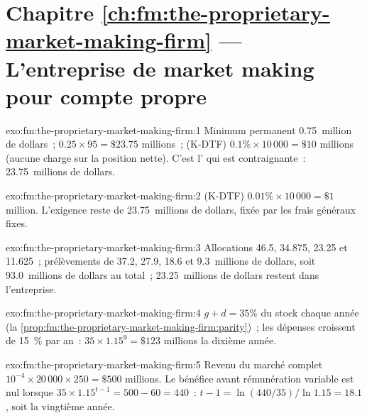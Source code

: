 \section*{Chapitre \ref{ch:fm:the-proprietary-market-making-firm} --- L'entreprise de market making pour compte propre}

\begin{solution}{exo:fm:the-proprietary-market-making-firm:1}
Minimum permanent 0.75~million de dollars~;  $0.25\times95=\$23.75$ millions~;  (K-DTF) $0.1\%\times10\,000=\$10$ millions (aucune
charge sur la position nette). C'est l' qui est contraignante~: 23.75~millions de dollars.
\end{solution}

\begin{solution}{exo:fm:the-proprietary-market-making-firm:2}
 (K-DTF) $0.01\%\times10\,000=\$1$ million. L'exigence reste de 23.75~millions de dollars, fixée par les frais généraux fixes.
\end{solution}

\begin{solution}{exo:fm:the-proprietary-market-making-firm:3}
Allocations 46.5, 34.875, 23.25 et 11.625~; prélèvements de 37.2, 27.9, 18.6 et 9.3~millions de dollars, soit 93.0~millions de dollars au total~; 23.25~millions de dollars restent dans l'entreprise.
\end{solution}

\begin{solution}{exo:fm:the-proprietary-market-making-firm:4}
$g+d=35\%$ du stock chaque année (la \cref{prop:fm:the-proprietary-market-making-firm:parity})~; les dépenses croissent de 15~\% par an~: $35\times1.15^9=\$123$
millions la dixième année.
\end{solution}

\begin{solution}{exo:fm:the-proprietary-market-making-firm:5}
Revenu du marché complet $10^{-4}\times20\,000\times250=\$500$ millions. Le bénéfice avant rémunération variable est nul lorsque $35\times1.15^{t-1}=500-60=440$~:
$t-1=\ln(440/35)/\ln1.15=18.1$, soit la vingtième année.
\end{solution}

